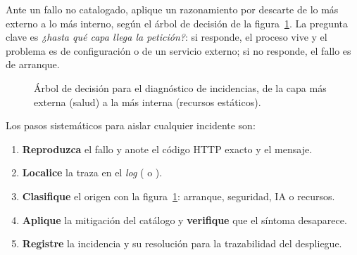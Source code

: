 Ante un fallo no catalogado, aplique un razonamiento por descarte de lo más externo a lo
más interno, según el árbol de decisión de la figura~\ref{fig:diag}. La pregunta clave es
\textit{¿hasta qué capa llega la petición?}: si  responde, el
proceso vive y el problema es de configuración o de un servicio externo; si no responde, el
fallo es de arranque.\par

\vspace{0.3cm}
\begin{figure}[h!]
\centering
{}
\caption{Árbol de decisión para el diagnóstico de incidencias, de la capa más externa (salud) a la más interna (recursos estáticos).}%
\label{fig:diag}
\end{figure}

\par\vspace{0.2cm}
Los pasos sistemáticos para aislar cualquier incidente son:\par
\begin{enumerate}[noitemsep]
    \item \textbf{Reproduzca} el fallo y anote el código HTTP exacto y el mensaje.
    \item \textbf{Localice} la traza en el \textit{log} ( o ).
    \item \textbf{Clasifique} el origen con la figura~\ref{fig:diag}: arranque, seguridad, IA o recursos.
    \item \textbf{Aplique} la mitigación del catálogo y \textbf{verifique} que el síntoma desaparece.
    \item \textbf{Registre} la incidencia y su resolución para la trazabilidad del despliegue.
\end{enumerate}


